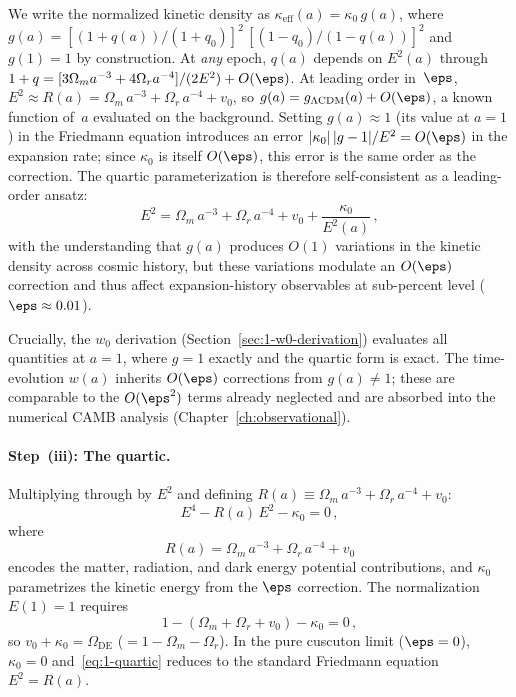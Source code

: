 We write the normalized kinetic density as $\kappa_{\mathrm{eff}}(a) = \kappa_0\, g(a)$, where $g(a) = [(1+q(a))/(1+q_0)]^2\,[(1-q_0)/(1-q(a))]^2$ and $g(1) = 1$ by construction. At \emph{any} epoch, $q(a)$ depends on $E^2(a)$ through $1+q = [3\Omega_m a^{-3} + 4\Omega_r a^{-4}]/(2E^2) + O(\eps)$. At leading order in~$\eps$, $E^2 \approx R(a) = \Omega_m\,a^{-3} + \Omega_r\,a^{-4} + v_0$, so $g(a) = g_{\Lambda\mathrm{CDM}}(a) + O(\eps)$, a known function of~$a$ evaluated on the \LCDM{} background. Setting $g(a) \approx 1$ (its value at $a = 1$) in the Friedmann equation introduces an error $|\kappa_0|\,|g-1|/E^2 = O(\eps)$ in the expansion rate; since $\kappa_0$ is itself $O(\eps)$, this error is the same order as the correction. The quartic parameterization is therefore self-consistent as a leading-order ansatz:
\begin{equation}
E^2 = \Omega_m\, a^{-3} + \Omega_r\, a^{-4} + v_0 + \frac{\kappa_0}{E^2(a)}\,,
\end{equation}
with the understanding that $g(a)$ produces $O(1)$ variations in the kinetic density across cosmic history, but these variations modulate an $O(\eps)$ correction and thus affect expansion-history observables at sub-percent level ($\eps \approx 0.01$).

Crucially, the $w_0$ derivation (Section~\ref{sec:1-w0-derivation}) evaluates all quantities at $a = 1$, where $g = 1$ exactly and the quartic form is exact. The time-evolution $w(a)$ inherits $O(\eps)$ corrections from $g(a) \neq 1$; these are comparable to the $O(\eps^2)$ terms already neglected and are absorbed into the numerical CAMB analysis (Chapter~\ref{ch:observational}).

\paragraph{Step~(iii): The quartic.} Multiplying through by $E^2$ and defining $R(a) \equiv \Omega_m\, a^{-3} + \Omega_r\, a^{-4} + v_0$:
\begin{equation}
\label{eq:1-quartic}
\boxed{E^4 - R(a)\, E^2 - \kappa_0 = 0}\,,
\end{equation}
where
\begin{equation}
\label{eq:1-R-function}
R(a) = \Omega_m\, a^{-3} + \Omega_r\, a^{-4} + v_0
\end{equation}
encodes the matter, radiation, and dark energy potential contributions, and $\kappa_0$ parametrizes the kinetic energy from the $\eps$ correction. The normalization $E(1) = 1$ requires
\begin{equation}
\label{eq:1-normalization}
1 - (\Omega_m + \Omega_r + v_0) - \kappa_0 = 0\,,
\end{equation}
so $v_0 + \kappa_0 = \Omega_{\mathrm{DE}}$ ($= 1 - \Omega_m - \Omega_r$). In the pure cuscuton limit ($\eps = 0$), $\kappa_0 = 0$ and~\eqref{eq:1-quartic} reduces to the standard Friedmann equation $E^2 = R(a)$.

